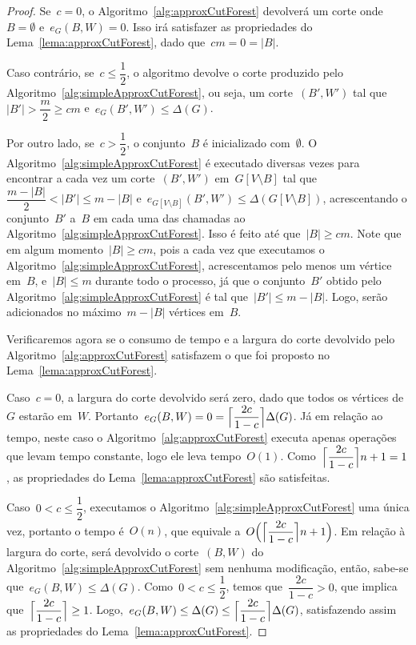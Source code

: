 \begin{proof}
	Se~${c=0}$, o Algoritmo~\ref{alg:approxCutForest} devolverá
	um corte onde~${B=\emptyset}$ e~${e_G(B,W) = 0}$. 
	Isso irá satisfazer as 
	propriedades do Lema~\ref{lema:approxCutForest}, dado 
	que~${cm=0=|B|}$.

	Caso contrário, se~${c \le \dfrac{1}{2}}$, o algoritmo 
	devolve o corte produzido pelo 
	Algoritmo~\ref{alg:simpleApproxCutForest}, ou seja,
	um corte~$(B',W')$ tal 
	que~${|B'|>\dfrac{m}{2}\ge cm}$ e~${e_G(B',W')\le \Delta(G)}$.

	Por outro lado, se~${c>\dfrac{1}{2}}$, 
	o conjunto~$B$ é inicializado com~$\emptyset$.
	O Algoritmo~\ref{alg:simpleApproxCutForest} é
	executado diversas vezes para encontrar a cada vez
	um corte~$(B',W')$ em~${G[V\setminus B]}$ 
	tal que~${\dfrac{m-|B|}{2}<|B'|\le m-|B|}$ 
	e~${e_{G[V\setminus B]}(B',W')\le\Delta(G[V\setminus B])}$, 
	acrescentando o 
	conjunto~$B'$ a~$B$ em cada uma das chamadas ao 
	Algoritmo~\ref{alg:simpleApproxCutForest}.
	Isso é feito até que~${|B|\ge cm}$.
	Note que em algum momento~${|B|\ge cm}$, pois a 
	cada vez que executamos o 
	Algoritmo~\ref{alg:simpleApproxCutForest}, acrescentamos pelo 
	menos um vértice em~$B$, 
	e~${|B|\le m}$ durante todo o processo, já que o
	conjunto~$B'$ obtido 
	pelo Algoritmo~\ref{alg:simpleApproxCutForest} 
	é tal que~$|B'|\le m-|B|$. Logo, serão adicionados no 
	máximo~${m-|B|}$ vértices em~$B$.
	
	\bigskip
	
	Verificaremos agora se o consumo de tempo e a largura do corte
	devolvido pelo Algoritmo~\ref{alg:approxCutForest} satisfazem
	o que foi proposto no Lema~\ref{lema:approxCutForest}.
	
	Caso~${c=0}$, a largura do corte devolvido será zero,
	dado que todos os vértices de~$G$ estarão em~$W$.
	Portanto~${e_G(B,W)=0=\ceil[\Big]{\dfrac{2c}{1-c}} \Delta(G)}$.
	Já em relação ao tempo, neste caso o Algoritmo~\ref{alg:approxCutForest}
	executa apenas operações que levam tempo constante, logo ele
	leva tempo~$O(1)$. 
	Como~${\ceil[\Big]{\dfrac{2c}{1-c}} n+1 = 1}$,
	as propriedades do Lema~\ref{lema:approxCutForest} são
	satisfeitas.

	Caso~${0<c\le \dfrac{1}{2}}$, executamos o
	Algoritmo~\ref{alg:simpleApproxCutForest} uma única vez, 
	portanto o tempo é~$O(n)$, que equivale 
	a~${O\Big(\ceil[\Big]{\dfrac{2c}{1-c}} n+1\Big)}$.
	Em relação à largura do corte, será devolvido o corte~$(B,W)$ do 
	Algoritmo~\ref{alg:simpleApproxCutForest} sem nenhuma 
	modificação, então, sabe-se que~${e_G(B,W)\le \Delta(G)}$.
	Como~${0<c\le\dfrac{1}{2}}$, temos que~${\dfrac{2c}{1-c}>0}$, 
	que implica que~${\ceil[\Big]{ \dfrac{2c}{1-c}}\ge 1}$.
	Logo,~${e_G(B,W)\le\Delta(G)\le \ceil[\Big]{\dfrac{2c}{1-c}}
	\Delta(G)}$, 
	satisfazendo assim as propriedades do 
	Lema~\ref{lema:approxCutForest}.


\end{proof}

